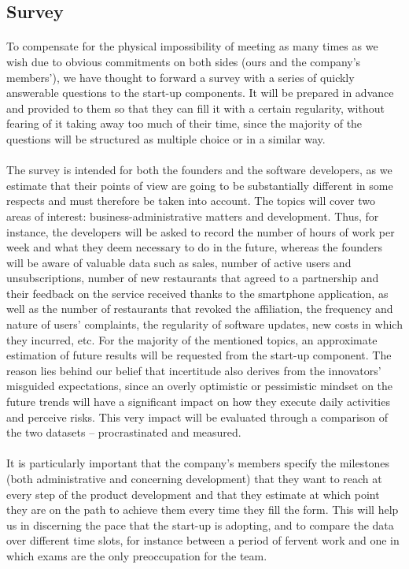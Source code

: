 \documentclass[twoside]{report}
\begin{document}
	\subsection{Survey}
	\paragraph{}
	To compensate for the physical impossibility of meeting as many times as we wish due to obvious commitments on both sides (ours and the company’s members’), we have thought to forward a survey with a series of quickly answerable questions to the start-up components. It will be prepared in advance and provided to them so that they can fill it with a certain regularity, without fearing of it taking away too much of their time, since the majority of the questions will be structured as multiple choice or in a similar way.
	\paragraph{}
	The survey is intended for both the founders and the software developers, as we estimate that their points of view are going to be substantially different in some respects and must therefore be taken into account. The topics will cover two areas of interest: business-administrative matters and development. Thus, for instance, the developers will be asked to record the number of hours of work per week and what they deem necessary to do in the future, whereas the founders will be aware of valuable data such as sales, number of active users and unsubscriptions, number of new restaurants that agreed to a partnership and their feedback on the service received thanks to the smartphone application, as well as the number of restaurants that revoked the affiliation, the frequency and nature of users’ complaints, the regularity of software updates, new costs in which they incurred, etc. For the majority of the mentioned topics, an approximate estimation of future results will be requested from the start-up component. The reason lies behind our belief that incertitude also derives from the innovators’ misguided expectations, since an overly optimistic or pessimistic mindset on the future trends will have a significant impact on how they execute daily activities and perceive risks. This very impact will be evaluated through a comparison of the two datasets – procrastinated and measured.
	\paragraph{}
	It is particularly important that the company’s members specify the milestones (both administrative and concerning development) that they want to reach at every step of the product development and that they estimate at which point they are on the path to achieve them every time they fill the form. This will help us in discerning the pace that the start-up is adopting, and to compare the data over different time slots, for instance between a period of fervent work and one in which exams are the only preoccupation for the team.
\end{document}
